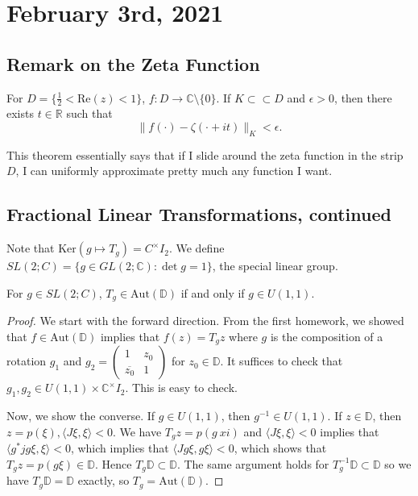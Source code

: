 \documentclass[12pt]{scrartcl}
\newcommand{\R}{\mathbb{R}}
\newcommand{\C}{\mathbb C}
\let \ol \overline
\begin{document}
\pagebreak
\section{February 3rd, 2021}
\subsection{Remark on the Zeta Function}
\begin{theorem}[S.M. Voronin 1975] For $D = \{\frac{1}{2} < \text{Re}(z) < 1\}$, $f : D \to \C \setminus \{0\}$.  If $K \subset \subset D$ and $\epsilon > 0$, then there exists $t \in \R$ such that 
$$\|f(\cdot) - \zeta(\cdot + it) \|_K < \epsilon.$$
\end{theorem}

This theorem essentially says that if I slide around the zeta function in the strip $D$, I can uniformly approximate pretty much any function I want.  

\subsection{Fractional Linear Transformations, continued}
Note that $\text{Ker}(g \mapsto T_g) = C^\times I_2$.  We define $SL(2; C) = \{g \in GL(2; \C) : \det g = 1\}$, the special linear group.  

\begin{theorem} For $g \in SL(2; C)$, $T_g \in \text{Aut}(\mathbb D)$ if and only if $g \in U(1, 1)$.
\end{theorem}
\begin{proof}
We start with the forward direction.  From the first homework, we showed that $f \in \text{Aut}(\mathbb D)$ implies that $f(z) = T_g z$ where $g$ is the composition of a rotation $g_1$ and $g_2 = \begin{pmatrix}
1 & z_0 \\
\ol{z_0} & 1
\end{pmatrix}$ for $z_0 \in \mathbb D$.  It suffices to check that $g_1, g_2 \in U(1, 1) \times \C^\times I_2$.  This is easy to check.  

Now, we show the converse.  If $g \in U(1, 1)$, then $g^{-1} \in U(1, 1)$.  If $z \in \mathbb D$, then $z = p(\xi), \langle J\xi, \xi\rangle < 0$.  We have $T_gz = p(g\ xi)$ and $\langle J\xi, \xi \rangle < 0$ implies that $\langle g^* j g\xi, \xi \rangle < 0$, which implies that $\langle Jg \xi, g\xi \rangle < 0$, which shows that $T_g z = p(g\xi) \in \mathbb D$.  Hence $T_g \mathbb D \subset \mathbb D$.  The same argument holds for $T_g^{-1} \mathbb D \subset \mathbb D$  so we have $T_g \mathbb D = \mathbb D$ exactly, so $T_g = \text{Aut}(\mathbb D)$.
\end{proof}
\end{document}
